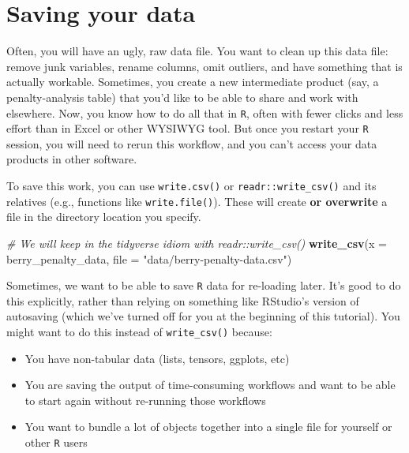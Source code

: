\documentclass[
]{book}
\newenvironment{Shaded}{\begin{snugshade}}{\end{snugshade}}
\newcommand{\AttributeTok}[1]{\textcolor[rgb]{0.13,0.29,0.53}{#1}}
\newcommand{\CommentTok}[1]{\textcolor[rgb]{0.56,0.35,0.01}{\textit{#1}}}
\newcommand{\FunctionTok}[1]{\textcolor[rgb]{0.13,0.29,0.53}{\textbf{#1}}}
\newcommand{\NormalTok}[1]{#1}
\newcommand{\StringTok}[1]{\textcolor[rgb]{0.31,0.60,0.02}{#1}}
\providecommand{\tightlist}{%
  \setlength{\itemsep}{0pt}\setlength{\parskip}{0pt}}
\begin{document}
\hypertarget{saving-your-data}{%
\section{Saving your data}\label{saving-your-data}}

Often, you will have an ugly, raw data file. You want to clean up this data file: remove junk variables, rename columns, omit outliers, and have something that is actually workable. Sometimes, you create a new intermediate product (say, a penalty-analysis table) that you'd like to be able to share and work with elsewhere. Now, you know how to do all that in \texttt{R}, often with fewer clicks and less effort than in Excel or other WYSIWYG tool. But once you restart your \texttt{R} session, you will need to rerun this workflow, and you can't access your data products in other software.

To save this work, you can use \texttt{write.csv()} or \texttt{readr::write\_csv()} and its relatives (e.g., functions like \texttt{write.file()}). These will create \textbf{or overwrite} a file in the directory location you specify.

\begin{Shaded}
\begin{Highlighting}[]
\CommentTok{\# We will keep in the tidyverse idiom with readr::write\_csv()}
\FunctionTok{write\_csv}\NormalTok{(}\AttributeTok{x =}\NormalTok{ berry\_penalty\_data,}
          \AttributeTok{file =} \StringTok{"data/berry{-}penalty{-}data.csv"}\NormalTok{)}
\end{Highlighting}
\end{Shaded}

Sometimes, we want to be able to save \texttt{R} data for re-loading later. It's good to do this explicitly, rather than relying on something like RStudio's version of autosaving (which we've turned off for you at the beginning of this tutorial). You might want to do this instead of \texttt{write\_csv()} because:

\begin{itemize}
\tightlist
\item
  You have non-tabular data (lists, tensors, ggplots, etc)
\item
  You are saving the output of time-consuming workflows and want to be able to start again without re-running those workflows
\item
  You want to bundle a lot of objects together into a single file for yourself or other \texttt{R} users
\end{itemize}
\end{document}
